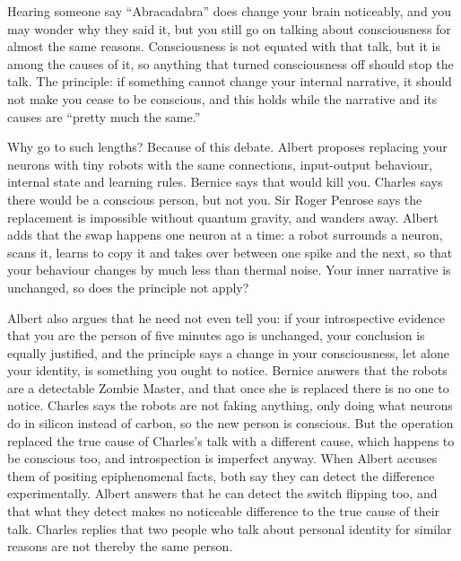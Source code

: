 Hearing someone say ``Abracadabra'' does change your brain noticeably, and you may wonder why they said it, but you still go on talking about consciousness for almost the same reasons. Consciousness is not equated with that talk, but it is among the causes of it, so anything that turned consciousness off should stop the talk. The principle: if something cannot change your internal narrative, it should not make you cease to be conscious, and this holds while the narrative and its causes are ``pretty much the same.''

Why go to such lengths? Because of this debate. Albert proposes replacing your neurons with tiny robots with the same connections, input-output behaviour, internal state and learning rules. Bernice says that would kill you. Charles says there would be a conscious person, but not you. Sir Roger Penrose says the replacement is impossible without quantum gravity, and wanders away. Albert adds that the swap happens one neuron at a time: a robot surrounds a neuron, scans it, learns to copy it and takes over between one spike and the next, so that your behaviour changes by much less than thermal noise. Your inner narrative is unchanged, so does the principle not apply? 

Albert also argues that he need not even tell you: if your introspective evidence that you are the person of five minutes ago is unchanged, your conclusion is equally justified, and the principle says a change in your consciousness, let alone your identity, is something you ought to notice.  Bernice answers that the robots are a detectable Zombie Master, and that once she is replaced there is no one to notice. Charles says the robots are not faking anything, only doing what neurons do in silicon instead of carbon, so the new person is conscious. But the operation replaced the true cause of Charles's talk with a different cause, which happens to be conscious too, and introspection is imperfect anyway. When Albert accuses them of positing epiphenomenal facts, both say they can detect the difference experimentally. Albert answers that he can detect the switch flipping too, and that what they detect makes no noticeable difference to the true cause of their talk. Charles replies that two people who talk about personal identity for similar reasons are not thereby the same person.

